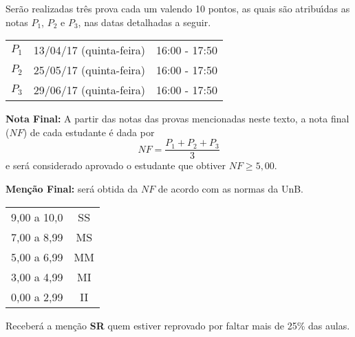 \documentclass[12pt]{article}
\begin{document}
 Ser\~ao realizadas tr\^es prova cada um valendo 10 pontos, as quais s\~ao atribu{\'\i}das as notas $P_1$, $P_2$ e $P_3$, nas datas detalhadas a seguir.

\begin{center}
    \begin{tabular}{|c|c|c|}
        \hline\hline
        \hspace{1cm}{\bf Prova}\hspace{1cm} & \hspace{3cm}{\bf Data}\hspace{3cm} & \hspace{1.7cm}{\bf Hor\'ario}\hspace{1.7cm} \\
        \hline\hline
        $P_1$ & 13/04/17 (quinta-feira) \phantom{x} & 16:00 - 17:50 \\
        \hline
        $P_2$ & 25/05/17 (quinta-feira) \phantom{x} & 16:00 - 17:50 \\
        \hline
        $P_3$ & 29/06/17 (quinta-feira) \phantom{x} & 16:00 - 17:50 \\
        \hline\hline
    \end{tabular}
\end{center}

{\bf \noindent Nota Final:} A partir das notas das provas mencionadas neste texto, a nota final ($NF$) de cada estudante \'e dada
por
\vspace{-0.15cm}
\[
NF = \frac{ P_1 + P_2 + P_3}{3} 
\]
e ser\'a considerado aprovado o estudante que obtiver $NF \geq 5,00$.

{\bf \noindent Men\c{c}\~ao Final:} ser\'a obtida da $NF$ de
acordo com as normas da UnB.
\begin{center}
    \begin{tabular}{c|c}
        \hline\hline
        \hspace{1cm}{Nota}\hspace{1cm} & \hspace{0.25cm}{Men\c{c}\~ao}\hspace{0.25cm}\\
        \hline\hline
        9,00 a 10,0 & SS \\
        \hline
        7,00 a 8,99 & MS \\
        \hline
        5,00 a 6,99 & MM \\
        \hline
        3,00 a 4,99 & MI \\
        \hline
        0,00 a 2,99  & II \\
        \hline\hline
    \end{tabular}
\end{center}
Receber\'a a men{\c c}\~ao {\bf SR} quem estiver reprovado por faltar mais de 25\%
das aulas.
\end{document}
